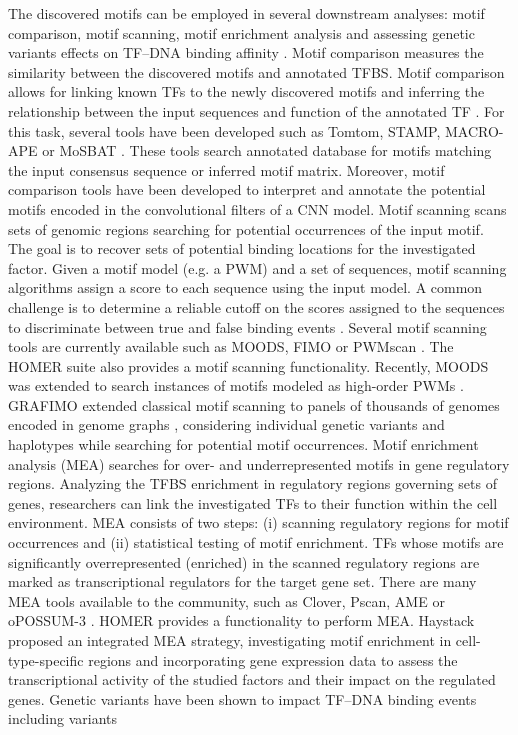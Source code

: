 \documentclass[a4paper, titlepage, openright]{book}
\newcommand{\grafimo}{GRAFIMO\xspace}
\begin{document}
The discovered motifs can be employed in several downstream analyses: motif comparison, motif scanning, motif enrichment analysis and assessing genetic variants effects on TF–DNA binding affinity \citep{tognon2023survey}. Motif comparison measures the similarity between the discovered motifs and annotated TFBS. Motif comparison allows for linking known TFs to the newly discovered motifs \citep{gupta2007quantifying} and inferring the relationship between the input sequences and function of the annotated TF \citep{weirauch2014determination}. For this task, several tools have been developed such as Tomtom, STAMP, MACRO-APE or MoSBAT \citep{gupta2007quantifying, mahony2007stamp, vorontsov2013jaccard, lambert2016motif}. These tools search annotated database for motifs matching the input consensus sequence or inferred motif matrix. Moreover, motif comparison tools have been developed to interpret and annotate the potential motifs encoded in the convolutional filters of a CNN model. Motif scanning scans sets of genomic regions searching for potential occurrences of the input motif. The goal is to recover sets of potential binding locations for the investigated factor. Given a motif model (e.g. a PWM) and a set of sequences, motif scanning algorithms assign a score to each sequence using the input model. A common challenge is to determine a reliable cutoff on the scores assigned to the sequences to discriminate between true and false binding events \citep{boeva2016analysis}. Several motif scanning tools are currently available such as MOODS, FIMO or PWMscan \citep{korhonen2009moods, grant2011fimo, ambrosini2018pwmscan}. The HOMER suite \citep{heinz2010simple} also provides a motif scanning functionality. Recently, MOODS was extended to search instances of motifs modeled as high-order PWMs \citep{korhonen2017fast}. \grafimo \citep{tognon2021grafimo} extended classical motif scanning to panels of thousands of genomes encoded in genome graphs \citep{paten2017genome}, considering individual genetic variants and haplotypes while searching for potential motif occurrences. Motif enrichment analysis (MEA) searches for over- and underrepresented motifs in gene regulatory regions. Analyzing the TFBS enrichment in regulatory regions governing sets of genes, researchers can link the investigated TFs to their function within the cell environment. MEA consists of two steps: (i) scanning regulatory regions for motif occurrences and (ii) statistical testing of motif enrichment. TFs whose motifs are significantly overrepresented (enriched) in the scanned regulatory regions are marked as transcriptional regulators for the target gene set. There are many MEA tools available to the community, such as Clover, Pscan, AME or oPOSSUM-3 \citep{frith2004detection, zambelli2009pscan, mcleay2010motif, kwon2012opossum}. HOMER \citep{heinz2010simple} provides a functionality to perform MEA. Haystack \citep{pinello2018haystack} proposed an integrated MEA strategy, investigating motif enrichment in cell-type-specific regions and incorporating gene expression data to assess the transcriptional activity of the studied factors and their impact on the regulated genes. Genetic variants have been shown to impact TF–DNA binding events \citep{de2006regulatory, wienert2015editing, weinhold2014genome} including variants 
\end{document}
